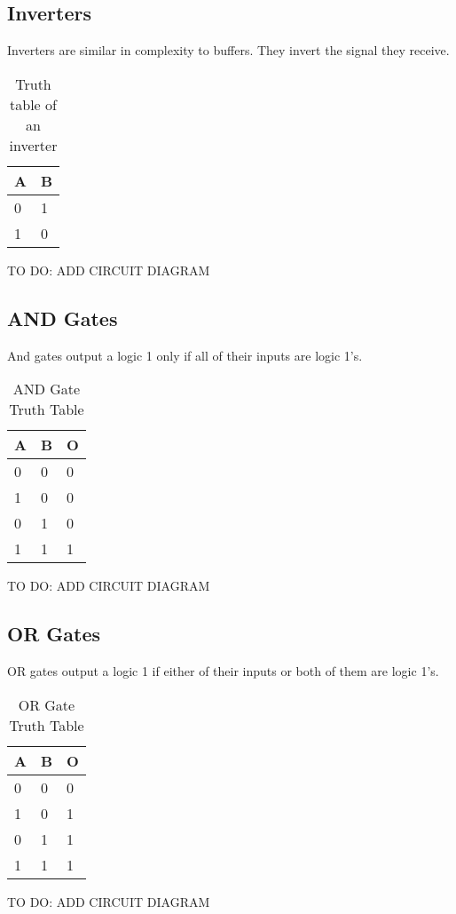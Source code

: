\subsection{Inverters}
Inverters are similar in complexity to buffers. They invert the signal they receive.
\begin{table}[H]
\centering
\begin{tabular}{l|l}
\hline
\multicolumn{1}{|l|}{\textbf{A}} & \multicolumn{1}{l|}{\textbf{B}} \\ \hline
0                                & 1                               \\
1                                & 0
\end{tabular}
\caption{Truth table of an inverter}
\label{tab:inverter-table}
\end{table}
TO DO: ADD CIRCUIT DIAGRAM

\subsection{AND Gates}
And gates output a logic 1 only if all of their inputs are logic 1's.
\begin{table}[H]
\centering
\begin{tabular}{l|l|l}
\hline
\multicolumn{1}{|l|}{\textbf{A}} & \textbf{B} & \multicolumn{1}{l|}{\textbf{O}} \\ \hline
0                                & 0          & 0                               \\
1                                & 0          & 0                               \\
0                                & 1          & 0                               \\
1                                & 1          & 1
\end{tabular}
\caption{AND Gate Truth Table}
\label{tab:and-table}
\end{table}
TO DO: ADD CIRCUIT DIAGRAM

\subsection{OR Gates}
OR gates output a logic 1 if either of their inputs or both of them are logic 1's.
\begin{table}[H]
\centering
\begin{tabular}{l|l|l}
\hline
\multicolumn{1}{|l|}{\textbf{A}} & \textbf{B} & \multicolumn{1}{l|}{\textbf{O}} \\ \hline
0                                & 0          & 0                               \\
1                                & 0          & 1                               \\
0                                & 1          & 1                               \\
1                                & 1          & 1
\end{tabular}
\caption{OR Gate Truth Table}
\label{tab:or-table}
\end{table}
TO DO: ADD CIRCUIT DIAGRAM

